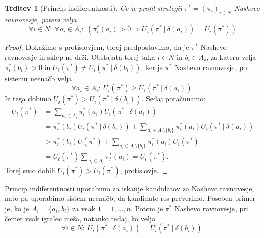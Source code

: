 \documentclass[10pt, a4paper]{article}
\newtheorem{trditev}[izr]{Trditev}
\newenvironment{noticeC}{%
  \tcolorbox[%
  notitle,
  empty,
  enhanced,  %
  breakable,
  coltext=black, 
  fontupper=\rmfamily,
  parbox=false,
  noparskip,
  sharp corners,
  boxrule=-1pt,  %
  frame hidden,
  left=7pt,  %
  right=7pt,
  top=5pt,
  bottom=5pt,
  before skip=2.5ex plus 2pt,
  after skip=2.5ex plus 2pt,
  overlay unbroken and last={%
  },
  ]}
{\endtcolorbox}
\newenvironment{dokaz}%
  {\begin{noticeC}\begin{proof}}%
  {\end{proof}\end{noticeC}}
\begin{document}
\begin{trditev}[Princip indiferentnosti]
  Če je profil strategij $\pi^* = (\pi_i)_{i \in N}$ Nashevo ravnovesje, potem velja 
  $$\forall i \in N:\ \forall a_i \in A_i:\ \left(\pi_i^* (a_i) > 0 \Rightarrow U_i (\pi^*\ |\ \delta(a_i)) = U_i(\pi^*)\right)$$
\end{trditev}

\begin{dokaz}
  Dokažimo s protislovjem, torej predpostavimo, da je $\pi^*$ Nashevo ravnovesje in sklep ne drži.
  Obstajata torej taka $i \in N$ in $b_i \in A_i$, za katera velja $\pi^*_i (b_i) > 0$ 
  in $U_i (\pi^*) \neq U_i (\pi^*\ |\ \delta(b_i))$. 
  ker je $\pi^*$ Nashevo ravnovesje, po sistemu neenačb velja 
  $$\forall a_i \in A_i:\ U_i (\pi^*) \geq U_i (\pi^*\ |\ \delta(a_i)).$$
  Iz tega dobimo $U_i (\pi^*) > U_i (\pi^*\ |\ \delta(b_i))$.
  Sedaj poračunamo:
  \begin{align*}
    U_i (\pi^*) &= \sum_{a_i \in A_i} \pi^*_i (a_i) U_i (\pi^*\ |\ \delta(a_i))\\
    &= \pi^*_i (b_i) U_i (\pi^*\ |\ \delta(b_i)) + \sum_{a_i \in A_i \setminus \{b_i\}}\pi^*_i (a_i) U_i (\pi^*\ |\ \delta(a_i))\\
    &> \pi^*_i (b_i) U(\pi^*) + \sum_{a_i \in A_i \setminus \{b_i\}}\pi^*_i (a_i) U_i (\pi^*)\\
    &= U_i (\pi^*) \sum_{a_i \in A_i} \pi_i ^* (a_i) = U_i (\pi^*).
  \end{align*}
  Torej smo dobili $U_i (\pi^*) > U_i (\pi^*)$, protislovje.
\end{dokaz}

Princip indiferentnosti uporabimo za iskanje kandidatov za Nashevo ravnovesje, nato pa uporabimo 
sistem neenačb, da kandidate res preverimo. Poseben primer je, ko je $A_i = \{a_i, b_i\}$ za vsak $1 = 1, \dots, n$.
Potem je $\pi^*$ Nashevo ravnovesje, pri čemer vsak igralec meša, natanko tedaj, ko velja 
$$\forall i \in N:\ U_i (\pi^*\ |\ \delta(a_i)) = U_i (\pi^*\ |\ \delta(b_i)).$$
\end{document}
